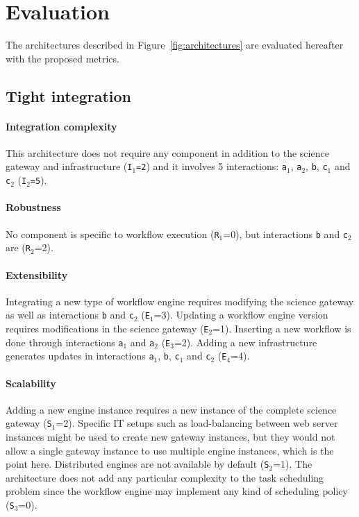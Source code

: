 \documentclass[preprint,3p,twocolumn]{elsarticle}
\newcommand{\correction}[1]{\color{blue}#1\color{black}\xspace}
\begin{document}
\section{\correction{Evaluation}}

\label{sec:evaluation}

The architectures described in Figure~\ref{fig:architectures} are
evaluated \correction{hereafter with the proposed metrics}.

\subsection{Tight integration}

\paragraph{Integration complexity} This architecture does not require any
component in addition to the science gateway and infrastructure
(\texttt{I$_1$=2}) and it involves 5 interactions: \texttt{a$_1$},
\texttt{a$_2$}, \texttt{b}, \texttt{c$_1$} and \texttt{c$_2$}
(\texttt{I$_2$=5}).

\paragraph{Robustness} No component is specific to workflow execution
(\texttt{R$_1$}=0), but interactions \texttt{b} and \texttt{c$_2$} are
(\texttt{R$_2$}=2).

\paragraph{Extensibility} Integrating a new type of workflow engine
requires modifying the science gateway as well as interactions
\texttt{b} and \texttt{c$_2$} (\texttt{E$_1$}=3). Updating a workflow
engine version requires modifications in the science gateway
(\texttt{E$_2$}=1).  Inserting a new workflow is done through
interactions \texttt{a$_1$} and \texttt{a$_2$}
(\texttt{E$_3$}=2). Adding a new infrastructure generates updates in
interactions \texttt{a$_1$}, \texttt{b}, \texttt{c$_1$} and
\texttt{c$_2$} (\texttt{E$_4$}=4).

\paragraph{Scalability} Adding a new engine instance requires a new
instance of the complete science gateway
(\texttt{S$_1$}=2). 
Specific IT setups such as load-balancing between
web server instances might be used to create new gateway instances, but they would not allow a single gateway instance to use multiple engine instances, which is the point here.
Distributed engines are not available by default
(\texttt{S$_2$}=1). 
The architecture does not add any particular complexity to the task scheduling problem since the workflow engine
may implement any kind of scheduling policy (\texttt{S$_3$}=0).
\end{document}
